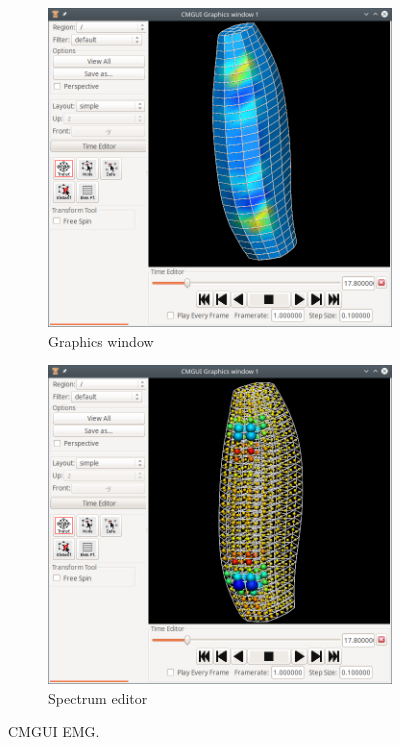 \begin{figure}%
  \centering%
  \begin{subfigure}[t]{0.48\textwidth}%
    \centering%
    \includegraphics[width=\textwidth]{images/implementation/cmgui_emg.png}%
    \caption{Graphics window}%
    \label{fig:cmgui_emg}%
  \end{subfigure}
  \begin{subfigure}[t]{0.48\textwidth}%
    \centering%
    \includegraphics[width=\textwidth]{images/implementation/cmgui_phie.png}
    \caption{Spectrum editor}%
    \label{fig:cmgui_phie}%
  \end{subfigure}
  \caption{CMGUI EMG.}%
  \label{fig:cmgui_output2}%
\end{figure}%



